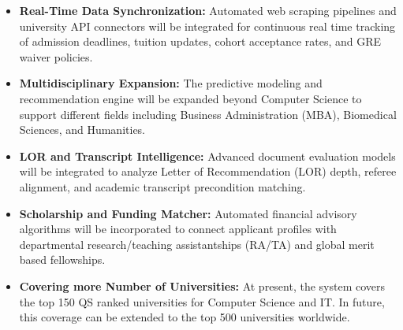     

\begin{itemize}
    \item \textbf{Real-Time Data Synchronization:} Automated web scraping pipelines and university API connectors will be integrated for continuous real time tracking of admission deadlines, tuition updates, cohort acceptance rates, and GRE waiver policies.

    \item \textbf{Multidisciplinary Expansion:} The predictive modeling and recommendation engine will be expanded beyond Computer Science to support different fields including Business Administration (MBA), Biomedical Sciences, and Humanities.

    \item \textbf{LOR and Transcript Intelligence:} Advanced document evaluation models will be integrated to analyze Letter of Recommendation (LOR) depth, referee alignment, and academic transcript precondition matching.

    \item \textbf{Scholarship and Funding Matcher:} Automated financial advisory algorithms will be incorporated to connect applicant profiles with departmental research/teaching assistantships (RA/TA) and global merit based fellowships.

    \item \textbf{Covering more Number of Universities:} At present, the system covers the top 150 QS ranked universities for Computer Science and IT. In future, this coverage can be extended to the top 500 universities worldwide. 
\end{itemize}
